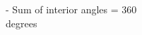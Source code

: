 \documentclass[preview]{standalone}
\begin{document}
\begin{center}
- Sum of interior angles = 360 \\degrees
\end{center}
\end{document}
